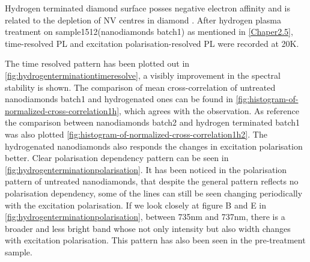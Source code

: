 Hydrogen terminated diamond surface posses negative electron affinity \citep{maier_electron_2001,ristein_electronic_2000,diederich_electron_1998} and is related to the depletion of NV centres in diamond \citep{stacey_depletion_2012}. After hydrogen plasma treatment on sample1512(nanodiamonds batch1) as mentioned in \ref{Chaper2.5}, time-resolved PL and excitation polarisation-resolved PL were recorded at 20K.

The time resolved pattern has been plotted out in \ref{fig:hydrogenterminationtimeresolve}, a visibly improvement in the spectral stability is shown. The comparison of mean cross-correlation of untreated nanodiamonds batch1 and hydrogenated ones can be found in \ref{fig:histogram-of-normalized-cross-correlation1h}, which agrees with the observation. As reference the comparison between nanodiamonds batch2 and hydrogen terminated batch1 was also plotted \ref{fig:histogram-of-normalized-cross-correlation1h2}. The hydrogenated nanodiamonds also responds the changes in excitation polarisation better. Clear polarisation dependency pattern can be seen in \ref{fig:hydrogenterminationpolarisation}. It has been noticed in the polarisation pattern of untreated nanodiamonds, that despite the general pattern reflects no polarisation dependency, some of the lines can still be seen changing periodically with the excitation polarisation. If we look closely at figure B and E in \ref{fig:hydrogenterminationpolarisation}, between 735nm and 737nm, there is a broader and less bright band whose not only intensity but also width changes with excitation polarisation. This pattern has also been seen in the pre-treatment sample.

 

